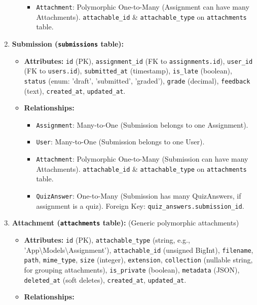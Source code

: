 \begin{enumerate}
\begin{itemize}
\begin{itemize}
            \item \texttt{Attachment}: Polymorphic One-to-Many (Assignment can have many Attachments). \texttt{attachable\_id} \& \texttt{attachable\_type} on \texttt{attachments} table.
        \end{itemize}
    \end{itemize}
    \item \textbf{Submission (\texttt{submissions} table):}
    \begin{itemize}
        \item \textbf{Attributes:} \texttt{id} (PK), \texttt{assignment\_id} (FK to \texttt{assignments.id}), \texttt{user\_id} (FK to \texttt{users.id}), \texttt{submitted\_at} (timestamp), \texttt{is\_late} (boolean), \texttt{status} (enum: 'draft', 'submitted', 'graded'), \texttt{grade} (decimal), \texttt{feedback} (text), \texttt{created\_at}, \texttt{updated\_at}.
        \item \textbf{Relationships:}
        \begin{itemize}
            \item \texttt{Assignment}: Many-to-One (Submission belongs to one Assignment).
            \item \texttt{User}: Many-to-One (Submission belongs to one User).
            \item \texttt{Attachment}: Polymorphic One-to-Many (Submission can have many Attachments). \texttt{attachable\_id} \& \texttt{attachable\_type} on \texttt{attachments} table.
            \item \texttt{QuizAnswer}: One-to-Many (Submission has many QuizAnswers, if assignment is a quiz). Foreign Key: \texttt{quiz\_answers.submission\_id}.
        \end{itemize}
    \end{itemize}
    \item \textbf{Attachment (\texttt{attachments} table):} (Generic polymorphic attachments)
    \begin{itemize}
        \item \textbf{Attributes:} \texttt{id} (PK), \texttt{attachable\_type} (string, e.g., 'App\textbackslash{}Models\textbackslash{}Assignment'), \texttt{attachable\_id} (unsigned BigInt), \texttt{filename}, \texttt{path}, \texttt{mime\_type}, \texttt{size} (integer), \texttt{extension}, \texttt{collection} (nullable string, for grouping attachments), \texttt{is\_private} (boolean), \texttt{metadata} (JSON), \texttt{deleted\_at} (soft deletes), \texttt{created\_at}, \texttt{updated\_at}.
        \item \textbf{Relationships:}

\end{itemize}
\end{enumerate}
